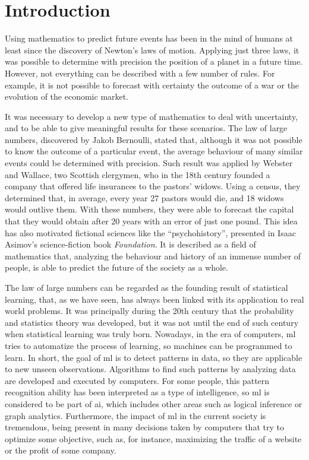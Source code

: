 
\chapter{Introduction} %
\label{Chapter1}



Using mathematics to predict future events has been in the mind of humans at least since the discovery of Newton's laws of motion. Applying just three laws, it was possible to determine with precision the position of a planet in a future time. However, not everything can be described with a few number of rules. For example, it is not possible to forecast with certainty the outcome of a war or the evolution of the economic market.

It was necessary to develop a new type of mathematics to deal with uncertainty, and to be able to give meaningful results for these scenarios. The law of large numbers, discovered by Jakob Bernoulli, stated that, although it was not possible to know the outcome of a particular event, the average behaviour of many similar events could be determined with precision. 
%
Such result was applied by Webster and Wallace, two Scottish clergymen, who in the 18th century founded a company that offered life insurances to the pastors' widows. Using a census, they determined that, in average, every year 27 pastors would die, and 18 widows would outlive them. With these numbers, they were able to forecast the capital that they would obtain after 20 years with an error of just one pound.
%
This idea has also motivated fictional sciences like the ``psychohistory'', presented in Isaac Asimov's science-fiction book \emph{Foundation}. It is described as a field of mathematics that, analyzing the behaviour and history of an immense number of people, is able to predict the future of the society as a whole. 

The law of large numbers can be regarded as the founding result of statistical learning, that, as we have seen, has always been linked with its application to real world problems. It was principally during the 20th century that the probability and statistics theory was developed, but it was not until the end of such century when statistical learning was truly born.
%
Nowadays, in the era of computers, \acrfull{ml} tries to automatize the process of learning, so machines can be programmed to learn. In short, the goal of \acrshort{ml} is to detect patterns in data, so they are applicable to new unseen observations. Algorithms to find such patterns by analyzing data are developed and executed by computers.
%
For some people, this pattern recognition ability has been interpreted as a type of intelligence, so \acrshort{ml} is considered to be part of \acrfull{ai}, which includes other areas such as logical inference or graph analytics.
%
Furthermore, the impact of \acrshort{ml} in the current society is tremendous, being present in many decisions taken by computers that try to optimize some objective, such as, for instance, maximizing the traffic of a website or the profit of some company.

